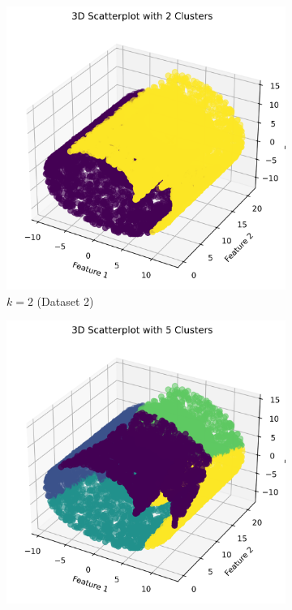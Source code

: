 \documentclass{article}
\begin{document}
\begin{figure}[h]
    \centering
    \begin{subfigure}[b]{0.45\textwidth}
        \includegraphics[width=\textwidth]{figures/3d_scatter_k2_d1.png}
        \caption{$k=2$ (Dataset 2)}
        \label{fig:3d_k2}
    \end{subfigure}
    \begin{subfigure}[b]{0.45\textwidth}
        \includegraphics[width=\textwidth]{figures/3d_scatter_k5_d1.png}

\end{subfigure}
\end{figure}
\end{document}
